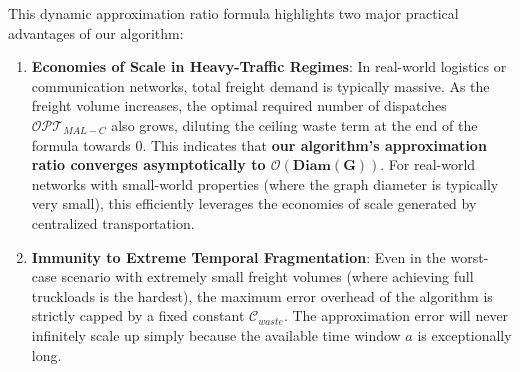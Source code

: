 \documentclass[12pt, a4paper]{article}
\begin{document}
This dynamic approximation ratio formula highlights two major practical advantages of our algorithm:
\begin{enumerate}[noitemsep]
    \item \textbf{Economies of Scale in Heavy-Traffic Regimes}: In real-world logistics or communication networks, total freight demand is typically massive. As the freight volume increases, the optimal required number of dispatches $\mathcal{OPT}_{MAL-C}$ also grows, diluting the ceiling waste term at the end of the formula towards $0$. This indicates that \textbf{our algorithm's approximation ratio converges asymptotically to $\mathbf{\mathcal{O}(\text{Diam}(G))}$}. For real-world networks with small-world properties (where the graph diameter is typically very small), this efficiently leverages the economies of scale generated by centralized transportation.
    \item \textbf{Immunity to Extreme Temporal Fragmentation}: Even in the worst-case scenario with extremely small freight volumes (where achieving full truckloads is the hardest), the maximum error overhead of the algorithm is strictly capped by a fixed constant $\mathcal{C}_{waste}$. The approximation error will never infinitely scale up simply because the available time window $a$ is exceptionally long.
\end{enumerate}
\end{document}
